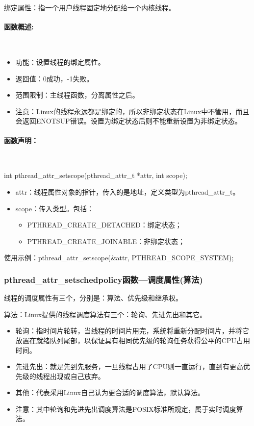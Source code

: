 \documentclass[UTF8]{article}%
\begin{document}
绑定属性：指一个用户线程固定地分配给一个内核线程。

\paragraph{函数概述:}~{}

\begin{itemize}
    \item 功能：设置线程的绑定属性。
    \item 返回值：0成功，-1失败。
    \item 范围限制：主线程函数，分离属性之后。
    \item 注意：Linux的线程永远都是绑定的，所以非绑定状态在Linux中不管用，而且会返回ENOTSUP错误。设置为绑定状态后则不能重新设置为非绑定状态。
\end{itemize}

\paragraph{函数声明：}~{}

int pthread\_attr\_setscope(pthread\_attr\_t *attr, int scope);

\begin{itemize}
    \item attr：线程属性对象的指针，传入的是地址，定义类型为pthread\_attr\_t。
    \item scope：传入类型。包括：
    {
        \begin{itemize}
            \item PTHREAD\_CREATE\_DETACHED：绑定状态；
            \item PTHREAD\_CREATE\_JOINABLE：非绑定状态；
        \end{itemize}
    }
\end{itemize}

使用示例：pthread\_attr\_setscope(\&attr, PTHREAD\_SCOPE\_SYSTEM); 

\subsubsection{pthread\_attr\_setschedpolicy函数---调度属性(算法)}

线程的调度属性有三个，分别是：算法、优先级和继承权。

算法：Linux提供的线程调度算法有三个：轮询、先进先出和其它。

\begin{itemize}
    \item 轮询：指时间片轮转，当线程的时间片用完，系统将重新分配时间片，并将它放置在就绪队列尾部，以保证具有相同优先级的轮询任务获得公平的CPU占用时间。
    \item 先进先出：就是先到先服务，一旦线程占用了CPU则一直运行，直到有更高优先级的线程出现或自己放弃。
    \item 其他：代表采用Linux自己认为更合适的调度算法，默认算法。
    \item 注意：其中轮询和先进先出调度算法是POSIX标准所规定，属于实时调度算法。
    
\end{itemize}
\end{document}
